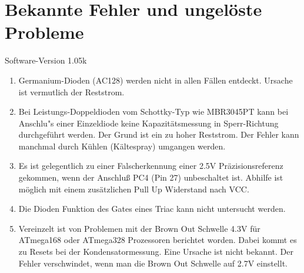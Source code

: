 
\chapter{Bekannte Fehler und ungelöste Probleme}
{\center Software-Version 1.05k}

\begin{enumerate}

\item Germanium-Dioden (AC128) werden nicht in allen Fällen entdeckt. Ursache ist vermutlich der Reststrom.

\item Bei Leistungs-Doppeldioden vom Schottky-Typ wie MBR3045PT kann bei Anschlu"s einer Einzeldiode keine Kapazitätsmessung in Sperr-Richtung 
durchgeführt werden. Der Grund ist ein zu hoher Reststrom. Der Fehler kann manchmal durch Kühlen (Kältespray) umgangen werden.

\item Es ist gelegentlich zu einer Falscherkennung einer 2.5V Präzisionsreferenz gekommen, wenn der Anschluß PC4 (Pin 27) unbeschaltet ist.
Abhilfe ist möglich mit einem zusätzlichen Pull Up Widerstand nach VCC.

\item Die Dioden Funktion des Gates eines Triac kann nicht untersucht werden.

\item Vereinzelt ist von Problemen mit der Brown Out Schwelle 4.3V für ATmega168 oder ATmega328 Prozessoren berichtet worden.
Dabei kommt es zu Resets bei der Kondensatormessung.  Eine Ursache ist nicht bekannt.
Der Fehler verschwindet, wenn man die Brown Out Schwelle auf 2.7V einstellt. 

\end{enumerate}
